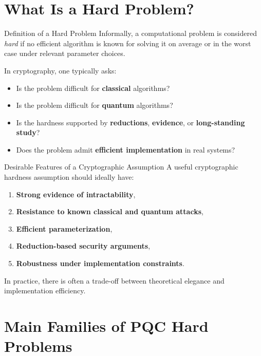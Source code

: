 \documentclass[aspectratio=169]{beamer}
\begin{document}
	\section{What Is a Hard Problem?}
	
	\begin{frame}{Definition of a Hard Problem}
		Informally, a computational problem is considered \emph{hard} if no efficient algorithm is known for solving it on average or in the worst case under relevant parameter choices.
		
		\vspace{0.75em}
		In cryptography, one typically asks:
		\begin{itemize}
			\item Is the problem difficult for \textbf{classical} algorithms?
			\item Is the problem difficult for \textbf{quantum} algorithms?
			\item Is the hardness supported by \textbf{reductions}, \textbf{evidence}, or \textbf{long-standing study}?
			\item Does the problem admit \textbf{efficient implementation} in real systems?
		\end{itemize}
	\end{frame}
	
	\begin{frame}{Desirable Features of a Cryptographic Assumption}
		A useful cryptographic hardness assumption should ideally have:
		\begin{enumerate}
			\item \textbf{Strong evidence of intractability},
			\item \textbf{Resistance to known classical and quantum attacks},
			\item \textbf{Efficient parameterization},
			\item \textbf{Reduction-based security arguments},
			\item \textbf{Robustness under implementation constraints}.
		\end{enumerate}
		
		\vspace{0.5em}
		In practice, there is often a trade-off between theoretical elegance and implementation efficiency.
	\end{frame}
	
	\section{Main Families of PQC Hard Problems}
	
\end{document}
